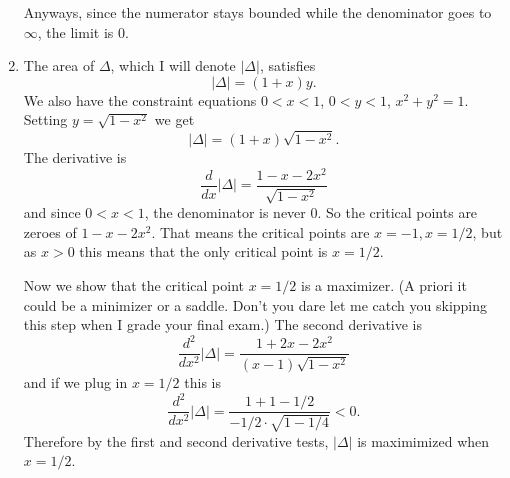 \documentclass[reqno,12pt,letterpaper]{amsart}
\theoremstyle{definition}
\numberwithin{equation}{section}
\begin{document}
\begin{enumerate}
Anyways, since the numerator stays bounded while the denominator goes to $\infty$, the limit is $0$.
\item The area of $\Delta$, which I will denote $|\Delta|$, satisfies
$$|\Delta| = (1 + x)y.$$
We also have the constraint equations $0 < x < 1$, $0 < y < 1$, $x^2 + y^2 = 1$. Setting $y = \sqrt{1 - x^2}$ we get
$$|\Delta| = (1 + x)\sqrt{1 - x^2}.$$
The derivative is
$$\frac{d}{dx} |\Delta| = \frac{1 - x - 2x^2}{\sqrt{1 - x^2}}$$
and since $0 < x < 1$, the denominator is never $0$. So the critical points are zeroes of $1 - x - 2x^2$.
That means the critical points are $x = -1, x = 1/2$, but as $x > 0$ this means that the only critical point is $x = 1/2$.

Now we show that the critical point $x = 1/2$ is a maximizer. (A priori it could be a minimizer or a saddle. Don't you dare let me catch you skipping this step when I grade your final exam.)
The second derivative is
$$\frac{d^2}{dx^2} |\Delta| = \frac{1 + 2x - 2x^2}{(x - 1)\sqrt{1 - x^2}}$$
and if we plug in $x = 1/2$ this is
$$\frac{d^2}{dx^2} |\Delta| = \frac{1 + 1 - 1/2}{-1/2 \cdot \sqrt{1 - 1/4}} < 0.$$
Therefore by the first and second derivative tests, $|\Delta|$ is maximimized when $x = 1/2$.


\end{enumerate}
\end{document}
